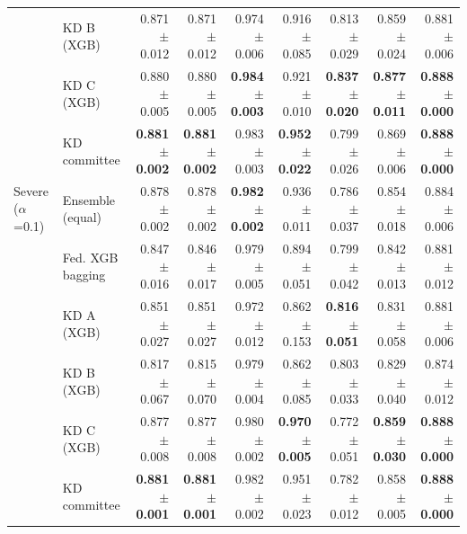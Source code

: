 \begin{table}[t]
\begin{tabular}{llrrrrrrr}
 & KD B (XGB) & 0.871 $\pm$ 0.012 & 0.871 $\pm$ 0.012 & 0.974 $\pm$ 0.006 & 0.916 $\pm$ 0.085 & 0.813 $\pm$ 0.029 & 0.859 $\pm$ 0.024 & 0.881 $\pm$ 0.006 \\
 & KD C (XGB) & 0.880 $\pm$ 0.005 & 0.880 $\pm$ 0.005 & \textbf{0.984 $\pm$ 0.003} & 0.921 $\pm$ 0.010 & \textbf{0.837 $\pm$ 0.020} & \textbf{0.877 $\pm$ 0.011} & \textbf{0.888 $\pm$ 0.000} \\
 & KD committee & \textbf{0.881 $\pm$ 0.002} & \textbf{0.881 $\pm$ 0.002} & 0.983 $\pm$ 0.003 & \textbf{0.952 $\pm$ 0.022} & 0.799 $\pm$ 0.026 & 0.869 $\pm$ 0.006 & \textbf{0.888 $\pm$ 0.000} \\
\midrule
Severe ($\alpha$=0.1) & Ensemble (equal) & 0.878 $\pm$ 0.002 & 0.878 $\pm$ 0.002 & \textbf{0.982 $\pm$ 0.002} & 0.936 $\pm$ 0.011 & 0.786 $\pm$ 0.037 & 0.854 $\pm$ 0.018 & 0.884 $\pm$ 0.006 \\
 & Fed. XGB bagging & 0.847 $\pm$ 0.016 & 0.846 $\pm$ 0.017 & 0.979 $\pm$ 0.005 & 0.894 $\pm$ 0.051 & 0.799 $\pm$ 0.042 & 0.842 $\pm$ 0.013 & 0.881 $\pm$ 0.012 \\
 & KD A (XGB) & 0.851 $\pm$ 0.027 & 0.851 $\pm$ 0.027 & 0.972 $\pm$ 0.012 & 0.862 $\pm$ 0.153 & \textbf{0.816 $\pm$ 0.051} & 0.831 $\pm$ 0.058 & 0.881 $\pm$ 0.006 \\
 & KD B (XGB) & 0.817 $\pm$ 0.067 & 0.815 $\pm$ 0.070 & 0.979 $\pm$ 0.004 & 0.862 $\pm$ 0.085 & 0.803 $\pm$ 0.033 & 0.829 $\pm$ 0.040 & 0.874 $\pm$ 0.012 \\
 & KD C (XGB) & 0.877 $\pm$ 0.008 & 0.877 $\pm$ 0.008 & 0.980 $\pm$ 0.002 & \textbf{0.970 $\pm$ 0.005} & 0.772 $\pm$ 0.051 & \textbf{0.859 $\pm$ 0.030} & \textbf{0.888 $\pm$ 0.000} \\
 & KD committee & \textbf{0.881 $\pm$ 0.001} & \textbf{0.881 $\pm$ 0.001} & 0.982 $\pm$ 0.002 & 0.951 $\pm$ 0.023 & 0.782 $\pm$ 0.012 & 0.858 $\pm$ 0.005 & \textbf{0.888 $\pm$ 0.000} \\
\bottomrule
\end{tabular}
\end{table}
